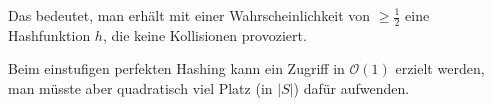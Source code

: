 \documentclass{scrartcl}%
\begin{document}
    \vspace*{0.3cm}
    Das bedeutet, man erhält mit einer Wahrscheinlichkeit von $\geq \frac{1}{2}$ eine Hashfunktion $h$, die keine Kollisionen provoziert.

    \vspace*{0.3cm}
    Beim einstufigen perfekten Hashing kann ein Zugriff in $\mathcal{O}(1)$ erzielt werden, man müsste aber quadratisch viel Platz (in $|S|$) dafür aufwenden.
\end{document}
